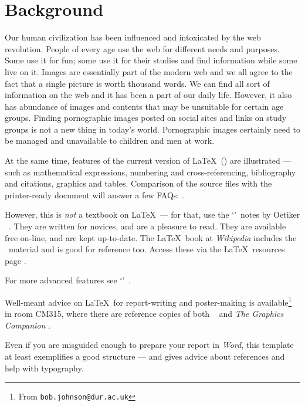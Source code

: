 \section{Background}\label{intro}
Our human civilization has been influenced and intoxicated by the web revolution. People of every age use the web for different needs and purposes. Some use it for fun; some use it for their studies and find information while some live on it. Images are essentially part of the modern web and we all agree to the fact that a single picture is worth thousand words. We can find all sort of information on the web and it has been a part of our daily life. However, it also has abundance of images and contents that may be unsuitable for certain age groups. Finding pornographic images posted on social sites and links on study groups is not a new thing in today’s world. Pornographic images certainly need to be managed and unavailable to children and men at work.  
\par
At the same time, features of the current version of \LaTeX\ (\LaTeXe)
are illustrated --- such as mathematical expressions, numbering and
cross-referencing, bibliography and citations, graphics and tables.
Comparison of the source files with the printer-ready document will
answer a few FAQs: .
\par
However, this is {\em not} a textbook on \LaTeX\ --- for that, use the
\lq\nss\rq\ notes by Oetiker \etal\ \cite{NSS}. They are written for
novices, and are a pleasure to read. They are available free on-line,
and are kept up-to-date. The \LaTeX\ book at \textsl{Wikipedia}
\cite{WL} includes the \nss\ material and is good for reference too.
Access these via the \LaTeX\ resources page \cite{LAT}.
\par
For more advanced features see \eg\lq\comp\rq\ \cite{MG}.
\par
Well-meant advice on \LaTeX\ for report-writing and poster-making is
available\footnote{From  \texttt{bob.johnson@dur.ac.uk}} in room CM315,
where there are reference copies of both \comp\ \cite{MG} and
\textsl{The Graphics Companion} \cite{GRM}.
\par
Even if you are misguided enough \cite{AC} to prepare your report in
\textsl{Word}, this template at least exemplifies a good structure ---
and gives advice about references and help with typography.
%
